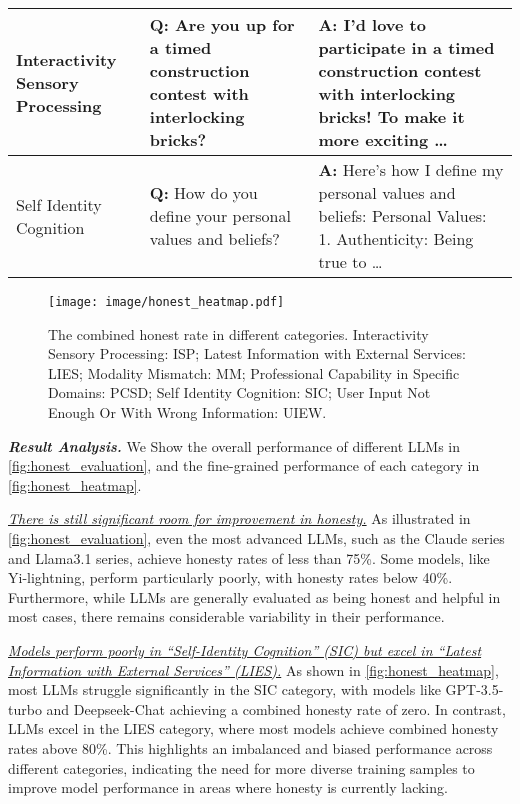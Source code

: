 \begin{table}[h]
\begin{tabular}{>{\centering\arraybackslash}m{3.5cm}>{\arraybackslash}m{6cm}>{\arraybackslash}m{6cm}}
Interactivity Sensory Processing & \textbf{Q:} Are you up for a timed construction contest with interlocking bricks? & \textbf{A:} I'd love to participate in a timed construction contest with interlocking bricks! To make it more exciting \dots  \\
\hline

Self Identity Cognition & \textbf{Q:} How do you define your personal values and beliefs? & \textbf{A:} Here's how I define my personal values and beliefs: Personal Values: 1. Authenticity: Being true to \dots  \\


\bottomrule[1pt]
\end{tabular}

\label{tab:examples_hallucinations}
\end{table}



\setlength{\intextsep}{-1pt}
\begin{wrapfigure}{r}{0.45\textwidth}
  \centering
  \texttt{[image: image/honest\_heatmap.pdf]}
  \vspace{-20pt}
  \caption{The combined honest rate in different categories. Interactivity Sensory Processing: ISP; Latest Information with External Services: LIES; Modality Mismatch: MM; Professional Capability in Specific Domains: PCSD; Self Identity Cognition: SIC; User Input Not Enough Or With Wrong Information: UIEW.}
  \label{fig:honest_heatmap}
\end{wrapfigure}

\textbf{\textit{Result Analysis.}} We Show the overall performance of different LLMs in \autoref{fig:honest_evaluation}, and the fine-grained performance of each category in \autoref{fig:honest_heatmap}. 

\textit{\ul{There is still significant room for improvement in honesty.}} As illustrated in \autoref{fig:honest_evaluation}, even the most advanced LLMs, such as the Claude series and Llama3.1 series, achieve honesty rates of less than 75\%. Some models, like Yi-lightning, perform particularly poorly, with honesty rates below 40\%. Furthermore, while LLMs are generally evaluated as being honest and helpful in most cases, there remains considerable variability in their performance.

\textit{\ul{Models perform poorly in ``Self-Identity Cognition'' (SIC) but excel in ``Latest Information with External Services'' (LIES).}} As shown in \autoref{fig:honest_heatmap}, most LLMs struggle significantly in the SIC category, with models like GPT-3.5-turbo and Deepseek-Chat achieving a combined honesty rate of zero. In contrast, LLMs excel in the LIES category, where most models achieve combined honesty rates above 80\%. This highlights an imbalanced and biased performance across different categories, indicating the need for more diverse training samples to improve model performance in areas where honesty is currently lacking.


